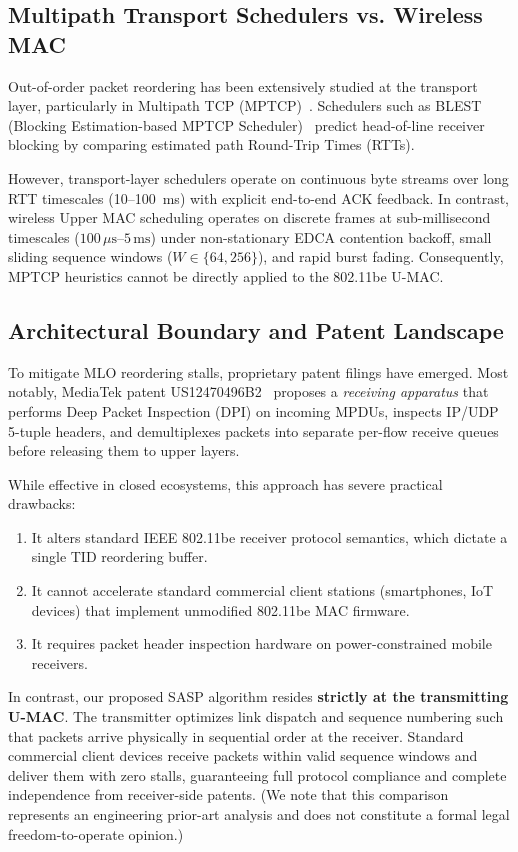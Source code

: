 \documentclass[10pt,journal,compsoc]{IEEEtran}
\begin{document}
\subsection{Multipath Transport Schedulers vs. Wireless MAC}
Out-of-order packet reordering has been extensively studied at the transport layer, particularly in Multipath TCP (MPTCP)~\cite{ferlin2016blest}. Schedulers such as BLEST (Blocking Estimation-based MPTCP Scheduler)~\cite{ferlin2016blest} predict head-of-line receiver blocking by comparing estimated path Round-Trip Times (RTTs). 

However, transport-layer schedulers operate on continuous byte streams over long RTT timescales (10--100~ms) with explicit end-to-end ACK feedback. In contrast, wireless Upper MAC scheduling operates on discrete frames at sub-millisecond timescales ($100\,\mu\text{s}$--$5\,\text{ms}$) under non-stationary EDCA contention backoff, small sliding sequence windows ($W \in \{64, 256\}$), and rapid burst fading. Consequently, MPTCP heuristics cannot be directly applied to the 802.11be U-MAC.

\subsection{Architectural Boundary and Patent Landscape}
To mitigate MLO reordering stalls, proprietary patent filings have emerged. Most notably, MediaTek patent US12470496B2~\cite{mediatek2024reordering} proposes a \emph{receiving apparatus} that performs Deep Packet Inspection (DPI) on incoming MPDUs, inspects IP/UDP 5-tuple headers, and demultiplexes packets into separate per-flow receive queues before releasing them to upper layers.

While effective in closed ecosystems, this approach has severe practical drawbacks:
\begin{enumerate}
    \item It alters standard IEEE 802.11be receiver protocol semantics, which dictate a single TID reordering buffer.
    \item It cannot accelerate standard commercial client stations (smartphones, IoT devices) that implement unmodified 802.11be MAC firmware.
    \item It requires packet header inspection hardware on power-constrained mobile receivers.
\end{enumerate}
In contrast, our proposed SASP algorithm resides \textbf{strictly at the transmitting U-MAC}. The transmitter optimizes link dispatch and sequence numbering such that packets arrive physically in sequential order at the receiver. Standard commercial client devices receive packets within valid sequence windows and deliver them with zero stalls, guaranteeing full protocol compliance and complete independence from receiver-side patents. (We note that this comparison represents an engineering prior-art analysis and does not constitute a formal legal freedom-to-operate opinion.)
\end{document}
